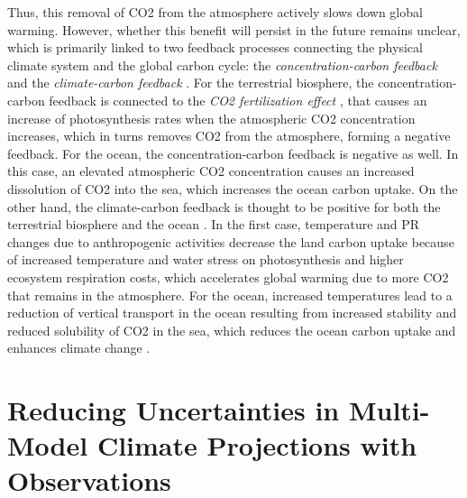Thus, this removal of \ac{CO2} from the atmosphere actively slows down global
warming. However, whether this benefit will persist in the future remains
unclear, which is primarily linked to two feedback processes connecting the
physical climate system and the global carbon cycle: the
\emph{concentration-carbon feedback} and the \emph{climate-carbon feedback}
\autocite{Friedlingstein2006, Gregory2009, Collins2013}. For the terrestrial
biosphere, the concentration-carbon feedback is connected to the \emph{\ac{CO2}
  fertilization effect} \autocite{Walker2020}, that causes an increase of
photosynthesis rates when the atmospheric \ac{CO2} concentration increases,
which in turns removes \ac{CO2} from the atmosphere, forming a negative
feedback. For the ocean, the concentration-carbon feedback is negative as well.
In this case, an elevated atmospheric \ac{CO2} concentration causes an
increased dissolution of \ac{CO2} into the sea, which increases the ocean
carbon uptake. On the other hand, the climate-carbon feedback is thought to be
positive for both the terrestrial biosphere and the ocean
\autocite{Gregory2009}. In the first case, temperature and \acl{PR} changes due
to anthropogenic activities decrease the land carbon uptake because of
increased temperature and water stress on photosynthesis and higher ecosystem
respiration costs, which accelerates global warming due to more \ac{CO2} that
remains in the atmosphere. For the ocean, increased temperatures lead to a
reduction of vertical transport in the ocean resulting from increased stability
and reduced solubility of \ac{CO2} in the sea, which reduces the ocean carbon
uptake and enhances climate change \autocite{Gregory2009}.


\section{Reducing Uncertainties in Multi-Model Climate Projections
  with Observations}
\label{sec:02:reducing_uncertainties}

